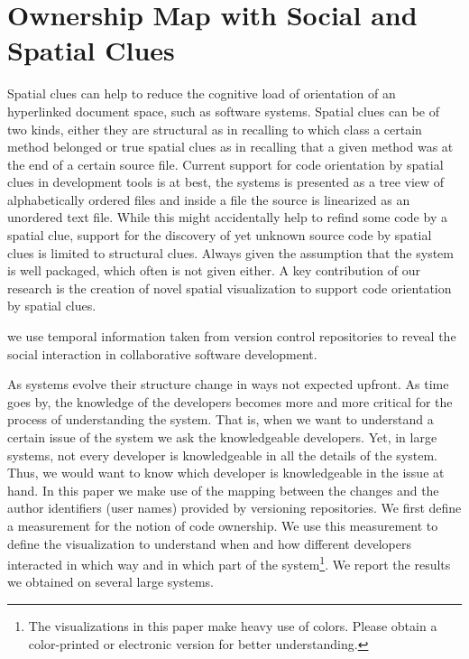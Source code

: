 \documentclass[10pt]{book}
\begin{document}

\chapter{Ownership Map with Social and Spatial Clues}
\label{the chapter on chronia}

Spatial clues can help to reduce the cognitive load of orientation of an hyperlinked document space, such as software systems. Spatial clues can be of two kinds, either they are structural as in recalling to which class a certain method belonged or true spatial clues as in recalling that a given method was at the end of a certain source file. Current support for code orientation by spatial clues in development tools is \adhoc at best, the systems is presented as a tree view of alphabetically ordered files and inside a file the source is linearized as an unordered text file. While this might accidentally help to refind some code by a spatial clue, support for the discovery of yet unknown source code by spatial clues is limited to structural clues.
Always given the assumption that the system is well packaged, which often is not given either.
A key contribution of our research is the creation of novel spatial visualization to support code orientation by spatial clues.

we use temporal information taken from version control repositories to reveal the social interaction in collaborative software development.



As systems evolve their structure change in ways not expected upfront. As time goes by, the knowledge of the developers becomes more and more critical for the process of understanding the system. That is, when we want to understand a certain issue of the system we ask the knowledgeable developers. Yet, in large systems, not every developer is knowledgeable in all the details of the system. Thus, we would want to know which developer is knowledgeable in the issue at hand. In this paper we make use of the mapping between the changes and the author identifiers (\eg user names) provided by versioning repositories. We first define a measurement for the notion of code ownership. We use this measurement to define the \omap visualization to understand when and how different developers interacted in which way and in which part of the system\footnote{The visualizations in this paper make heavy use of colors. Please obtain a color-printed or electronic version for better understanding.}. We report the results we obtained on several large systems.
\end{document}
